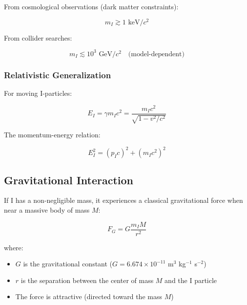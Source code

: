 From cosmological observations (dark matter constraints):

\begin{equation}
\label{eq:i_mass_lower_bound}
m_I \gtrsim 1 \text{ keV}/c^2
\end{equation}

From collider searches:

\begin{equation}
\label{eq:i_mass_upper_bound}
m_I \lesssim 10^3 \text{ GeV}/c^2 \quad \text{(model-dependent)}
\end{equation}

\subsubsection{Relativistic Generalization}

For moving I-particles:

\begin{equation}
\label{eq:i_relativistic_energy}
E_I = \gamma m_I c^2 = \frac{m_I c^2}{\sqrt{1 - v^2/c^2}}
\end{equation}

The momentum-energy relation:

\begin{equation}
\label{eq:i_momentum_energy}
E_I^2 = (p_I c)^2 + (m_I c^2)^2
\end{equation}

\subsection{Gravitational Interaction}
\label{subsec:gravitational_interaction}

If I has a non-negligible mass, it experiences a classical gravitational force when near a massive body of mass $M$:

\begin{equation}
\label{eq:gravitational_force}
F_G = G \frac{m_I M}{r^2}
\end{equation}

where:
\begin{itemize}
    \item $G$ is the gravitational constant ($G = 6.674 \times 10^{-11}$ m$^3$ kg$^{-1}$ s$^{-2}$)
    \item $r$ is the separation between the center of mass $M$ and the I particle
    \item The force is attractive (directed toward the mass $M$)
\end{itemize}

